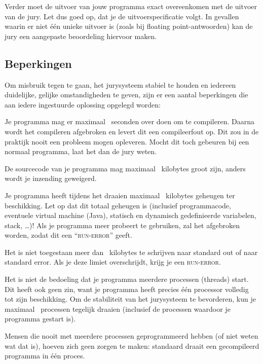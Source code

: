 Verder moet de uitvoer van jouw programma exact overeenkomen met de
uitvoer van de jury. Let dus goed op, dat je de uitvoerspecificatie
volgt. In gevallen waarin er niet \'e\'en unieke uitvoer is (zoals bij
floating point-antwoorden) kan de jury een aangepaste beoordeling
hiervoor maken.

\subsection{Beperkingen}\label{runlimits}

Om misbruik tegen te gaan, het jurysysteem stabiel te houden en iedereen
duidelijke, gelijke omstandigheden te geven, zijn er een aantal
beperkingen die aan iedere ingestuurde oplossing opgelegd worden:

\begin{description}
\item[compile-tijd]
Je programma mag er maximaal \COMPILETIME\ seconden over doen om te
compileren. Daarna wordt het compileren afgebroken en levert dit een
compileerfout op. Dit zou in de praktijk nooit een probleem mogen
opleveren. Mocht dit toch gebeuren bij een normaal programma, laat het
dan de jury weten.

\item[sourcegrootte]
De sourcecode van je programma mag maximaal \SOURCESIZE\ kilobytes
groot zijn, anders wordt je inzending geweigerd.

\item[geheugen]
Je programma heeft tijdens het draaien maximaal \MEMLIMIT\ kilobytes
geheugen ter beschikking. Let op dat dit totaal geheugen is (inclusief
programmacode, eventuele virtual machine (Java), statisch en dynamisch
gedefinieerde variabelen, stack, \dots)! Als je programma meer
probeert te gebruiken, zal het afgebroken worden, zodat dit een
``\textsc{run-error}'' geeft.

\item[uitvoergrootte]
Het is niet toegestaan meer dan \FILELIMIT\ kilobytes te schrijven naar
standard out of naar standard error. Als je deze limiet overschrijdt,
krijg je een \textsc{run-error}.

\item[aantal processen]
Het is niet de bedoeling dat je programma meerdere processen (threads)
start. Dit heeft ook geen zin, want je programma heeft precies \'e\'en
processor volledig tot zijn beschikking. Om de stabiliteit van het
jurysysteem te bevorderen, kun je maximaal \PROCLIMIT\ processen
tegelijk draaien (inclusief de processen waardoor je programma
gestart is).

Mensen die nooit met meerdere processen geprogrammeerd hebben (of
niet weten wat dat is), hoeven zich geen zorgen te maken: standaard
draait een gecompileerd programma in \'e\'en proces.

\end{description}

